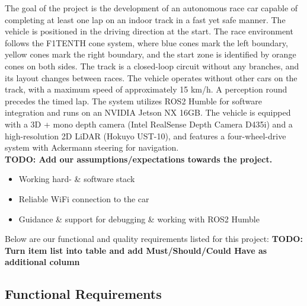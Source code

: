 The goal of the project is the development of an autonomous race car capable of completing at least one lap on an indoor track in a fast yet safe manner.
The vehicle is positioned in the driving direction at the start. The race environment follows the F1TENTH cone system, where blue cones mark the left boundary, yellow cones mark the right boundary, and the start zone is identified by orange cones on both sides.
The track is a closed-loop circuit without any branches, and its layout changes between races. The vehicle operates without other cars on the track, with a maximum speed of approximately 15 km/h. 
A perception round precedes the timed lap. The system utilizes ROS2 Humble for software integration and runs on an NVIDIA Jetson NX 16GB. The vehicle is equipped with a 3D + mono depth camera (Intel RealSense Depth Camera D435i) and a high-resolution 2D LiDAR (Hokuyo UST-10), and features a four-wheel-drive system with Ackermann steering for navigation. \\
\newline
\textbf{TODO: Add our assumptions/expectations towards the project.}\\
\newline
\begin{itemize}
	\item Working hard- \& software stack
	\item Reliable WiFi connection to the car
	\item Guidance \& support for debugging \& working with ROS2 Humble
\end{itemize}
Below are our functional and quality requirements listed for this project:
\textbf{TODO: Turn item list into table and add Must/Should/Could Have as additional column}
\subsection{Functional Requirements}


